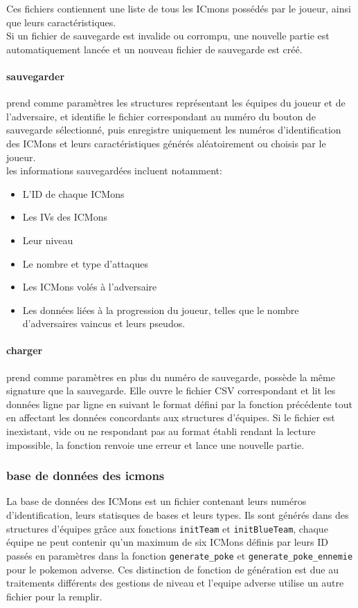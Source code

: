 \documentclass[12pt,a4paper, twoside]{article}
\begin{document}
     Ces fichiers contiennent une liste de tous les ICmons possédés par le joueur, ainsi que leurs caractéristiques.\\
     Si un fichier de sauvegarde est invalide ou corrompu, une nouvelle partie est automatiquement lancée et un nouveau fichier de sauvegarde est créé.\\

    \paragraph{sauvegarder}prend comme paramètres les structures représentant les équipes du joueur et de l'adversaire,
    et identifie le fichier correspondant au numéro du bouton de sauvegarde sélectionné, puis enregistre uniquement les numéros d'identification des ICMons et leurs caractéristiques générés aléatoirement ou choisis par le joueur.\\
    les informations sauvegardées incluent notamment:
    \begin{itemize}
        \item L'ID de chaque ICMons
        \item Les IVs des ICMons
        \item Leur niveau
        \item Le nombre et type d'attaques
        \item Les ICMons volés à l'adversaire
        \item Les données liées à la progression du joueur, telles que le nombre d’adversaires vaincus et leurs pseudos.
    \end{itemize}
    \paragraph{charger}prend comme paramètres en plus du numéro de sauvegarde, possède la même signature que la sauvegarde. Elle ouvre le fichier CSV
    correspondant et lit les données ligne par ligne en suivant le format défini par la fonction précédente tout en affectant les données concordants aux structures d'équipes. Si le fichier est inexistant, vide ou ne respondant pas au format établi rendant la lecture impossible, la fonction renvoie une erreur et lance une nouvelle partie.

    \subsubsection{base de données des icmons}
    La base de données des ICMons est un fichier contenant leurs numéros d'identification, leurs statisques de bases et leurs types.
    Ils sont générés dans des structures d'équipes grâce aux fonctions \texttt{initTeam} et \texttt{initBlueTeam}, chaque équipe ne peut contenir qu'un maximum de six ICMons définis par leurs ID passés en paramètres dans la fonction \texttt{generate\_poke} et \texttt{generate\_poke\_ennemie} pour le pokemon adverse. Ces distinction de fonction de génération est due au traitements différents des gestions de niveau et l'equipe adverse utilise un autre fichier pour la remplir.\\
\end{document}

